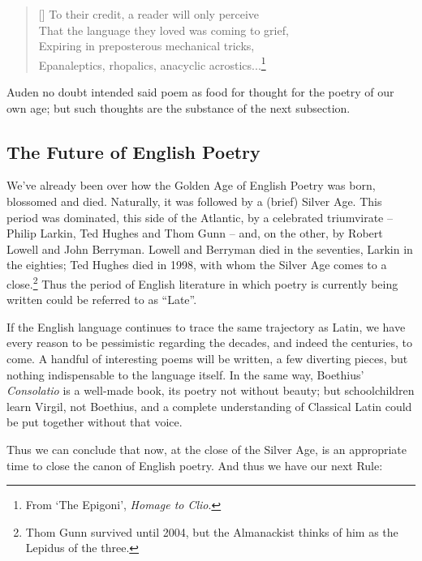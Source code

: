 \documentclass[0main.tex]{subfiles}
\begin{document}
\bigskip

\settowidth{\versewidth}{\footnotesize To their credit, a reader will only perceive}
\begin{verse}[\versewidth]
{\footnotesize
To their credit, a reader will only perceive\\
That the language they loved was coming to grief,\\
Expiring in preposterous mechanical tricks,\\
Epanaleptics, rhopalics, anacyclic acrostics...\footnote{From `The Epigoni', \emph{Homage to Clio}.}\\}
\end{verse}

\bigskip

Auden no doubt intended said poem as food for thought for the poetry of our own age; but such thoughts are the substance of the next subsection.

\bigskip

\subsection{The Future of English Poetry}

We've already been over how the Golden Age of English Poetry was born, blossomed and died. Naturally, it was followed by a (brief) Silver Age. This period was dominated, this side of the Atlantic, by a celebrated triumvirate -- Philip Larkin, Ted Hughes and Thom Gunn -- and, on the other, by Robert Lowell and John Berryman. Lowell and Berryman died in the seventies, Larkin in the eighties; Ted Hughes died in 1998, with whom the Silver Age comes to a close.\footnote{Thom Gunn survived until 2004, but the Almanackist thinks of him as the Lepidus of the three.} Thus the period of English literature in which poetry is currently being written could be referred to as ``Late''.

If the English language continues to trace the same trajectory as Latin, we have every reason to be pessimistic regarding the decades, and indeed the centuries, to come. A handful of interesting poems will be written, a few diverting pieces, but nothing indispensable to the language itself. In the same way, Boethius' \emph{Consolatio} is a well-made book, its poetry not without beauty; but schoolchildren learn Virgil, not Boethius, and a complete understanding of Classical Latin could be put together without that voice.

Thus we can conclude that now, at the close of the Silver Age, is an appropriate time to close the canon of English poetry. And thus we have our next Rule:
\end{document}
